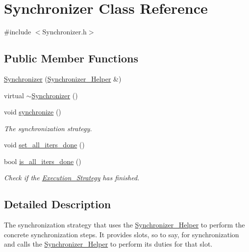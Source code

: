 \hypertarget{class_synchronizer}{
\section{Synchronizer Class Reference}
\label{class_synchronizer}
}


{\ttfamily \#include $<$Synchronizer.h$>$}

\subsection*{Public Member Functions}
\begin{DoxyCompactItemize}
\item 
\hyperlink{class_synchronizer_a7b0b39f6e15645271bf1afa043027ceb}{Synchronizer} (\hyperlink{class_synchronizer___helper}{Synchronizer\_\-Helper} \&)
\item 
virtual \hyperlink{class_synchronizer_a3fb971c6c9cdb4ab5cddb3e2d3b6ac6f}{$\sim$Synchronizer} ()
\item 
void \hyperlink{class_synchronizer_aa633d250239482b3e11c958560308107}{synchronize} ()
\begin{DoxyCompactList}\small\item\em The synchronization strategy. \item\end{DoxyCompactList}\item 
void \hyperlink{class_synchronizer_a892a030d7fecf6a204721a75b43d8ca9}{set\_\-all\_\-iters\_\-done} ()
\item 
bool \hyperlink{class_synchronizer_a204d452071fdb6db0247fa2ec1194511}{is\_\-all\_\-iters\_\-done} ()
\begin{DoxyCompactList}\small\item\em Check if the \hyperlink{class_execution___strategy}{Execution\_\-Strategy} has finished. \item\end{DoxyCompactList}\end{DoxyCompactItemize}


\subsection{Detailed Description}
The synchronization strategy that uses the \hyperlink{class_synchronizer___helper}{Synchronizer\_\-Helper} to perform the concrete synchronization steps. It provides slots, so to say, for synchronization and calls the \hyperlink{class_synchronizer___helper}{Synchronizer\_\-Helper} to perform its duties for that slot.

